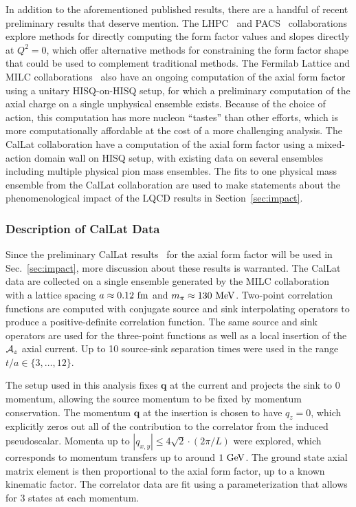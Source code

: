 In addition to the aforementioned published results, there are
 a handful of recent preliminary results that deserve mention.
The LHPC~\cite{Hasan:2017wwt} and PACS~\cite{Ishikawa:2021eut} collaborations
 explore methods for directly computing the form factor values and slopes
 directly at $Q^2=0$, which offer alternative methods for constraining
 the form factor shape that could be used to complement traditional methods.
The Fermilab Lattice and MILC collaborations~\cite{Meyer:2016kwb,Lin:2019pia,Lin:2020wko} also have an ongoing
 computation of the axial form factor using a unitary HISQ-on-HISQ setup,
 for which a preliminary computation of the axial charge on
 a single unphysical ensemble exists.
Because of the choice of action, this computation has more nucleon ``tastes''
 than other efforts, which is more computationally affordable
 at the cost of a more challenging analysis.
The CalLat collaboration have a computation of the axial form factor
 using a mixed-action domain wall on HISQ setup,
 with existing data on several ensembles including multiple physical pion mass ensembles.
The fits to one physical mass ensemble from the CalLat collaboration are used
 to make statements about the phenomenological impact of the LQCD results in Section~\ref{sec:impact}.

\subsubsection{Description of CalLat Data}\label{sec:callatdata}

Since the preliminary CalLat results~\cite{Meyer:2021vfq} for the axial form factor will be used
 in Sec.~\ref{sec:impact}, more discussion about these results is warranted.
The CalLat data are collected on a single ensemble generated
 by the MILC collaboration~\cite{MILC:2012znn}
 with a lattice spacing $a\approx 0.12~{\rm fm}$ and $m_\pi\approx 130~{\rm MeV}$.
Two-point correlation functions are computed with conjugate
 source and sink interpolating operators
 to produce a positive-definite correlation function.
The same source and sink operators are used for the three-point functions
 as well as a local insertion of the ${\cal A}_z$ axial current.
Up to 10 source-sink separation times were used in the range $t/a\in\{3,\dots,12\}$.

The setup used in this analysis fixes $\bm{q}$ at the current
 and projects the sink to 0 momentum, allowing the source momentum to be
 fixed by momentum conservation.
The momentum $\bm{q}$ at the insertion is chosen to have $q_z=0$,
 which explicitly zeros out all of the contribution to the correlator
 from the induced pseudoscalar.
Momenta up to $|q_{x,y}| \leq 4\sqrt{2}\cdot (2\pi/L)$ were explored,
 which corresponds to momentum transfers up to around $1~{\rm GeV}$.
The ground state axial matrix element is then proportional to the axial form factor,
 up to a known kinematic factor.
The correlator data are fit using a parameterization that allows
 for 3 states at each momentum.

